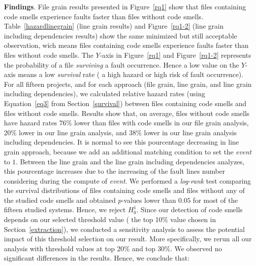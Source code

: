 \textbf{Findings}. {\color{blue}File grain} results presented in Figure~\ref{rq1} show that files containing code smells experience faults faster than files without code smells. {\color{blue}Table~\ref{hazardlinegrain} (line grain results) and Figure~\ref{rq1-2} (line grain including dependencies results) show the same minimized but still acceptable observation, wich means files containing code smells experience faults faster than files without code smells.} The $Y$-axis in Figure~\ref{rq1} {\color{blue}and Figure~\ref{rq1-2}} represents the probability of a file \emph{surviving} a fault occurrence. Hence a low value on the $Y$-axis means a low \emph{survival} rate (\ie{} a high hazard or high risk of fault occurrence).  
For all {\color{blue}fifteen} projects, {\color{blue}and for each approach (file grain, line grain, and line grain including dependencies),} we calculated relative hazard rates (using Equation~\ref{eq3} from Section~\ref{survival}) between files containing code smells and files without code smells. Results show that, on average, files without code smells have hazard rates {\color{blue}76\% lower than files with code smells in our file grain analysis, 20\% lower in our line grain analysis, and 38\% lower in our line grain analysis including dependencies. It is normal to see this pourcentage decreasing in line grain approach, because we add an additional matching condition to set the \emph{event} to $1$. Between the line grain and the line grain including dependencies analyzes, this pourcentage increases due to the increasing of the fault lines number considering during the compute of \emph{event}.} We performed a \textsl{log-rank} test comparing the survival distributions of files containing code smells and files without any of the studied code smells and obtained $p$-values lower than $0.05$ for {\color{blue}most of the fifteen} studied systems. Hence, we reject $H^{1}_{0}$.
Since our detection of code smells depends on our selected threshold value (\ie{} the top 10\% value chosen in Section~\ref{extraction}), we conducted a sensitivity analysis to assess the potential impact of this threshold selection on our result. More specifically, we rerun all our analysis with threshold values at top 20\% and top 30\%. We observed no significant differences in the results. Hence, we conclude that:



